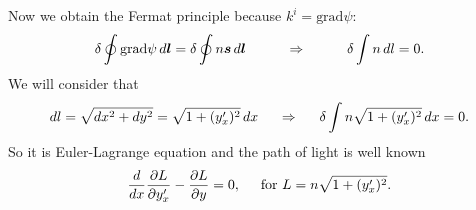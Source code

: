 Now we obtain the Fermat principle because $k^i = \text{grad} \psi$:
\begin{equation*}
	\delta \oint \text{grad} \psi \, d \mbox{\boldmath $l$} = \delta \oint n \mbox{\boldmath $s$} \, d \mbox{\boldmath $l$} \hspace{1 cm}
	\Rightarrow
	\hspace{1 cm}
	\delta \int n \, d l = 0.
\end{equation*}
We will consider that 
\begin{equation*}
	d l = \sqrt{ d x^2 + d y^2} = \sqrt{1 + (y_x')^2} \, d x
	\hspace{0.5 cm}
	\Rightarrow
	\hspace{0.5 cm}
	\delta \int n \sqrt{1 + (y_x')^2} \, d x = 0.
\end{equation*}
So it is Euler-Lagrange equation and the path of light is well known
\begin{equation*}
	\frac{d}{d x} \frac{\partial L}{\partial y_x'} - \frac{\partial L}{\partial y} = 0,
	\hspace{0.5 cm}
	\text{for } L = n \sqrt{1 + (y_x')^2}.
\end{equation*}